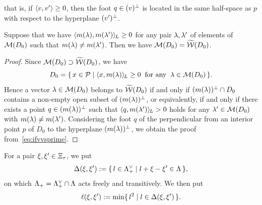 \documentclass{amsart} %
\begin{document}
%
that is, if $\langle v, v^{\prime} \rangle\ge 0$, 
then the foot $q\in (v)^{\perp}$ is located in the same half-space as $p$ with respect to the hyperplane 
$(v^{\prime})^{\perp}$.
%
%
\begin{lemma}\label{lem:pairsofMMM}
Suppose that we have
$\langle m(\lambda), m(\lambda^{\prime}) \rangle_{\hskip -1pt L}\ge 0$
for any pair $\lambda, \lambda^{\prime}$ of elements of $ \mathord{\mathcal{M}}(D_0)$
such that $m(\lambda)\ne m(\lambda^{\prime})$.
Then we have 
$\mathord{\mathcal{M}}(D_0)=\widetilde{\mathord{\mathcal{W}}} (D_0)$.
\end{lemma}
%
\begin{proof}
Since $\mathord{\mathcal{M}}(D_0)\supset \widetilde{\mathord{\mathcal{W}}} (D_0)$,
 we have 
 \[
 D_0=\{\,{x\in \mathord{\mathcal{P}}}\mid {\langle x, m(\lambda) \rangle_{\hskip -1pt L}\ge 0\;\; \textrm{for any} \;\; \lambda\in \mathord{\mathcal{M}}(D_0)} \,\}.
\]
Hence a vector $\lambda\in \mathord{\mathcal{M}}(D_0)$ belongs to $\widetilde{\mathord{\mathcal{W}}} (D_0)$
if and only if 
$(m(\lambda))^{\perp} \cap D_0$ contains a non-empty open subset of $(m(\lambda))^{\perp} $,
or equivalently,
if and only if 
there exists a point $q\in (m(\lambda))^{\perp}$
such that $\langle q, m(\lambda^{\prime}) \rangle_{\hskip -1pt L}> 0$ holds for any $\lambda^{\prime}\in \mathord{\mathcal{M}}(D_0)$
with $m(\lambda)\ne m(\lambda^{\prime})$.
Considering the foot $q$ of 
the perpendicular from an interior point $p$ of $D_0$
to the hyperplane $(m(\lambda))^{\perp}$,
we obtain the proof from~\eqref{eq:ifvvsprime}.
\end{proof}
%
%
For a pair $\xi, \xi^{\prime}\in \Xi_{\tau}$,
we put
%
\begin{equation}\label{eq:diffellset}
\Delta(\xi, \xi^{\prime}):=
\{\,{l\in \Lambda_{+}^{\vee}}\mid {l+\xi-\xi^{\prime}\in \Lambda} \,\},
\end{equation}
%
on which $\Lambda_{+}= \Lambda_{+}^{\vee}\cap\Lambda$ acts freely and transitively.
We then put 
%
\begin{equation}\label{eq:diffell}
\ell(\xi, \xi^{\prime}):=\min\{\,{l^2}\mid {l\in \Delta(\xi, \xi^{\prime})} \,\}.
\end{equation}
%
\end{document}
